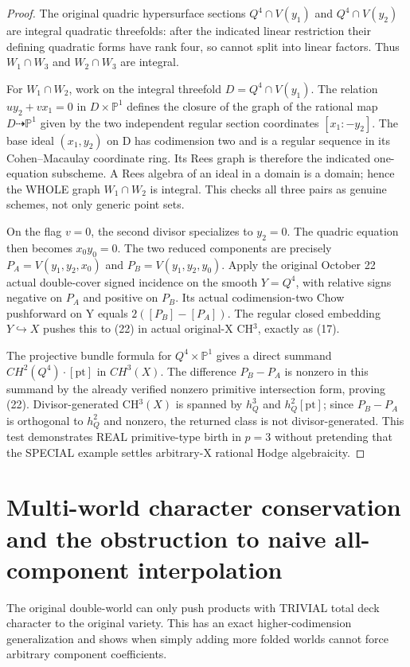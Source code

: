 \documentclass[11pt]{article}
\begin{document}
\begin{proof}
The original quadric hypersurface sections
$Q^4\cap V(y_1)$ and
$Q^4\cap V(y_2)$ are integral quadratic
threefolds: after the indicated linear
restriction their defining quadratic
forms have rank four, so cannot split
into linear factors.
Thus $W_1\cap W_3$ and
$W_2\cap W_3$ are integral.

For $W_1\cap W_2$, work on the
integral threefold
$D=Q^4\cap V(y_1)$.
The relation
$u y_2+v x_1=0$ in $D\times\mathbb P^1$
defines the closure of the graph
of the rational map
$D\dashrightarrow\mathbb P^1$
given by the two independent
regular section coordinates
$[x_1:-y_2]$.
The base ideal $(x_1,y_2)$
on D has codimension two and is
a regular sequence in its
Cohen--Macaulay coordinate ring.
Its Rees graph is therefore
the indicated one-equation
subscheme. A Rees algebra of an
ideal in a domain is a domain;
hence the WHOLE graph
$W_1\cap W_2$ is integral.
This checks all three pairs
as genuine schemes, not only
generic point sets.

On the flag $v=0$, the second
divisor specializes to $y_2=0$.
The quadric equation then becomes
$x_0 y_0=0$. The two reduced
components are precisely
$P_A=V(y_1,y_2,x_0)$ and
$P_B=V(y_1,y_2,y_0)$.
Apply the original October 22
actual double-cover signed incidence
on the smooth $Y=Q^4$,
with relative signs negative on
$P_A$ and positive on $P_B$.
Its actual codimension-two Chow
pushforward on Y equals
$2([P_B]-[P_A])$.
The regular closed embedding
$Y\hookrightarrow X$ pushes this
to (22) in actual original-X
CH$^3$, exactly as (17).

The projective bundle formula for
$Q^4\times\mathbb P^1$ gives a
direct summand
$CH^2(Q^4)\cdot[\mathrm{pt}]$
in $CH^3(X)$.
The difference $P_B-P_A$ is nonzero
in this summand by the already
verified nonzero primitive
intersection form, proving (22).
Divisor-generated CH$^3(X)$
is spanned by $h_Q^3$ and
$h_Q^2[\mathrm{pt}]$; since
$P_B-P_A$ is orthogonal to $h_Q^2$
and nonzero, the returned class
is not divisor-generated.
This test demonstrates REAL
primitive-type birth in $p=3$
without pretending that the
SPECIAL example settles arbitrary-X
rational Hodge algebraicity.
\end{proof}


\section{Multi-world character conservation and the obstruction to naive all-component interpolation}
The original double-world can only push
products with TRIVIAL total deck character
to the original variety. This has an exact
higher-codimension generalization and shows
when simply adding more folded worlds cannot
force arbitrary component coefficients.
\end{document}
